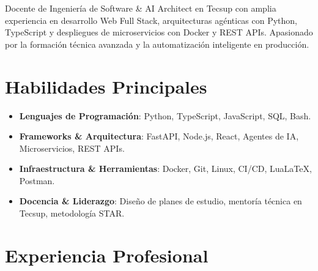 \documentclass[11pt,a4paper,sans]{moderncv}
\begin{document}
\makecvtitle
\vspace{-12pt}


\small{Docente de Ingeniería de Software \& AI Architect en Tecsup con amplia experiencia en desarrollo Web Full Stack, arquitecturas agénticas con Python, TypeScript y despliegues de microservicios con Docker y REST APIs. Apasionado por la formación técnica avanzada y la automatización inteligente en producción.}

\vspace{6pt}


\section{Habilidades Principales}
\begin{itemize}
\item \textbf{Lenguajes de Programación}: Python, TypeScript, JavaScript, SQL, Bash.
\item \textbf{Frameworks \& Arquitectura}: FastAPI, Node.js, React, Agentes de IA, Microservicios, REST APIs.
\item \textbf{Infraestructura \& Herramientas}: Docker, Git, Linux, CI/CD, LuaLaTeX, Postman.
\item \textbf{Docencia \& Liderazgo}: Diseño de planes de estudio, mentoría técnica en Tecsup, metodología STAR.
\end{itemize}

\vspace{6pt}


\section{Experiencia Profesional}

\end{document}

